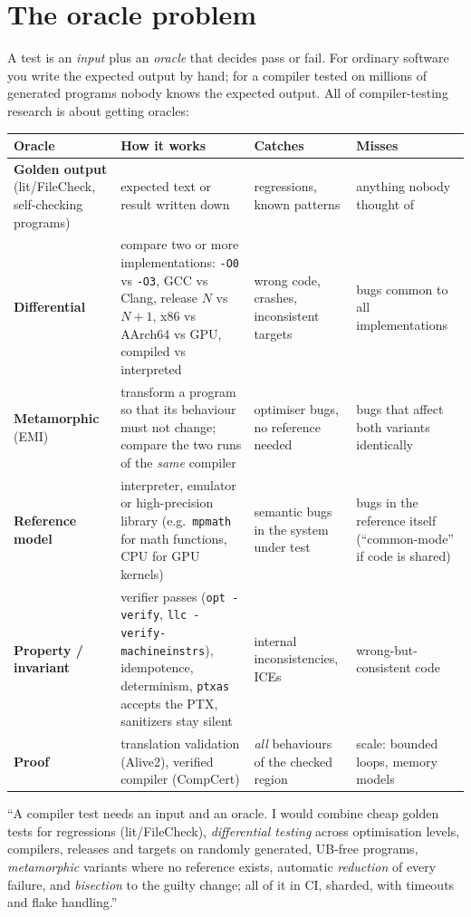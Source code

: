 \documentclass[10pt,a4paper,openany,oneside]{report}
\newcommand{\prio}[1]{\texorpdfstring{\ifcase#1\or{\color{gold}\ding{72}}\or{\color{gold}\ding{72}\ding{72}}\or{\color{gold}\ding{72}\ding{72}\ding{72}}\fi}{}}
\begin{document}
\section{The oracle problem \prio{3}}
A test is an \emph{input} plus an \emph{oracle} that decides pass or fail. For ordinary software you write the expected output by hand; for a compiler tested on millions of generated programs nobody knows the expected output. All of compiler-testing research is about getting oracles:
\begin{center}\small
\begin{xltabular}{\textwidth}{@{}L{3.5cm}L{4.4cm}L{3.2cm}Y@{}}
\toprule
\textbf{Oracle} & \textbf{How it works} & \textbf{Catches} & \textbf{Misses}\\
\midrule\endhead
\textbf{Golden output} (lit/FileCheck, self-checking programs) & expected text or result written down & regressions, known patterns & anything nobody thought of\\
\textbf{Differential} & compare two or more implementations: \texttt{-O0} vs \texttt{-O3}, GCC vs Clang, release $N$ vs $N{+}1$, x86 vs AArch64 vs GPU, compiled vs interpreted & wrong code, crashes, inconsistent targets & bugs common to all implementations\\
\textbf{Metamorphic} (EMI) & transform a program so that its behaviour must not change; compare the two runs of the \emph{same} compiler & optimiser bugs, no reference needed & bugs that affect both variants identically\\
\textbf{Reference model} & interpreter, emulator or high-precision library (e.g.\ \texttt{mpmath} for math functions, CPU for GPU kernels) & semantic bugs in the system under test & bugs in the reference itself (``common-mode'' if code is shared)\\
\textbf{Property / invariant} & verifier passes (\texttt{opt -verify}, \texttt{llc -verify-machineinstrs}), idempotence, determinism, \texttt{ptxas} accepts the PTX, sanitizers stay silent & internal inconsistencies, ICEs & wrong-but-consistent code\\
\textbf{Proof} & translation validation (Alive2), verified compiler (CompCert) & \emph{all} behaviours of the checked region & scale: bounded loops, memory models\\
\bottomrule
\end{xltabular}
\end{center}
\begin{tipbox}
``A compiler test needs an input and an oracle. I would combine cheap golden tests for regressions (lit/FileCheck), \emph{differential testing} across optimisation levels, compilers, releases and targets on randomly generated, UB-free programs, \emph{metamorphic} variants where no reference exists, automatic \emph{reduction} of every failure, and \emph{bisection} to the guilty change; all of it in CI, sharded, with timeouts and flake handling.''
\end{tipbox}
\end{document}
